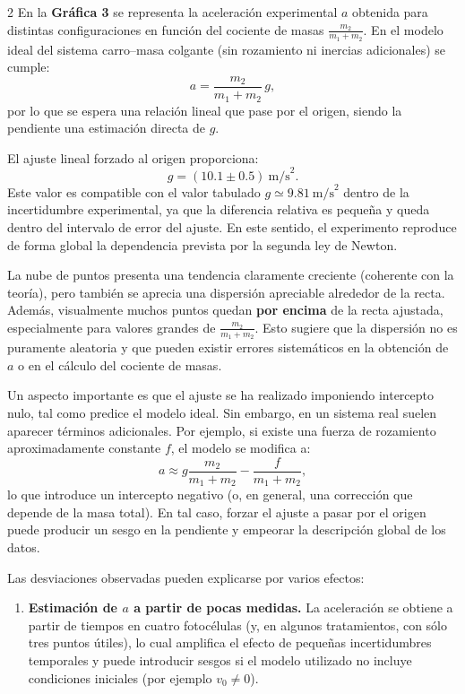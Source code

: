 \documentclass[12pt,a4paper]{article}
\begin{document}
\begin{multicols}{2}
En la \textbf{Gráfica 3} se representa la aceleración experimental $a$ obtenida para distintas configuraciones en función del cociente de masas $\frac{m_2}{m_1+m_2}$. En el modelo ideal del sistema carro--masa colgante (sin rozamiento ni inercias adicionales) se cumple:
\begin{equation}
a = \frac{m_2}{m_1+m_2}\,g,
\end{equation}
por lo que se espera una relación lineal que pase por el origen, siendo la pendiente una estimación directa de $g$.

\bigskip
El ajuste lineal forzado al origen proporciona:
\begin{equation}
g = (10.1 \pm 0.5)\ \text{m/s}^2.
\end{equation}
Este valor es compatible con el valor tabulado $g \simeq 9.81\ \text{m/s}^2$ dentro de la incertidumbre experimental, ya que la diferencia relativa es pequeña y queda dentro del intervalo de error del ajuste. En este sentido, el experimento reproduce de forma global la dependencia prevista por la segunda ley de Newton.

\bigskip
La nube de puntos presenta una tendencia claramente creciente (coherente con la teoría), pero también se aprecia una dispersión apreciable alrededor de la recta. Además, visualmente muchos puntos quedan \textbf{por encima} de la recta ajustada, especialmente para valores grandes de $\frac{m_2}{m_1+m_2}$. Esto sugiere que la dispersión no es puramente aleatoria y que pueden existir errores sistemáticos en la obtención de $a$ o en el cálculo del cociente de masas.

\bigskip
Un aspecto importante es que el ajuste se ha realizado imponiendo intercepto nulo, tal como predice el modelo ideal. Sin embargo, en un sistema real suelen aparecer términos adicionales. Por ejemplo, si existe una fuerza de rozamiento aproximadamente constante $f$, el modelo se modifica a:
\begin{equation}
a \approx g\frac{m_2}{m_1+m_2} - \frac{f}{m_1+m_2},
\end{equation}
lo que introduce un intercepto negativo (o, en general, una corrección que depende de la masa total). En tal caso, forzar el ajuste a pasar por el origen puede producir un sesgo en la pendiente y empeorar la descripción global de los datos.

\bigskip
Las desviaciones observadas pueden explicarse por varios efectos:

\begin{enumerate}
\item \textbf{Estimación de $a$ a partir de pocas medidas.}
La aceleración se obtiene a partir de tiempos en cuatro fotocélulas (y, en algunos tratamientos, con sólo tres puntos útiles), lo cual amplifica el efecto de pequeñas incertidumbres temporales y puede introducir sesgos si el modelo utilizado no incluye condiciones iniciales (por ejemplo $v_0\neq 0$).


\end{enumerate}
\end{multicols}
\end{document}
